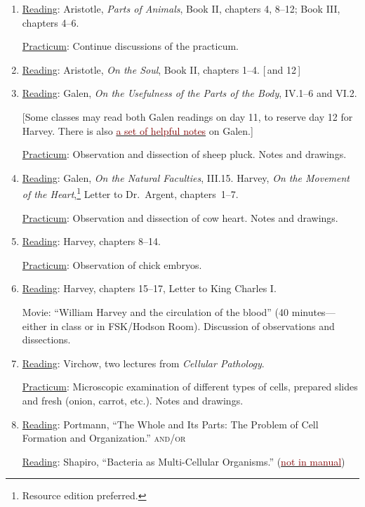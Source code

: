 \documentclass{article}
\newcommand{\rd}{\uline{Reading}}
\newcommand{\pc}{\uline{Practicum}}
\begin{document}
\begin{enumerate}
\item \rd: Aristotle, \emph{Parts of Animals}, Book II, chapters 4, 8--12; Book III, chapters 4--6.

\pc: Continue discussions of the practicum.

\item \rd:\label{soul} Aristotle, \emph{On the Soul}, Book II, chapters 1--4. [\,and 12\,]

\item \rd: Galen, \emph{On the Usefulness of the Parts of the Body}, IV.1--6 and VI.2.

 [Some classes may read
both Galen readings on day 11, to reserve day 12 for Harvey. There is also \href{https://sjca.sharepoint.com/:b:/r/sites/Departments/Faculty/Documents/Annapolis/Freshman\%20Lab/Schedule\%20and\%20files/Galen_notes.pdf?csf=1&web=1&e=CPEIlP}{\textcolor{Maroon}{a set of helpful notes}} on Galen.]

\pc: Observation and dissection of sheep pluck. Notes and drawings.

\item \rd: Galen, \emph{On the Natural Faculties}, III.15.
	Harvey, \emph{On the Movement of the Heart},\footnote{Resource edition preferred.} Letter to Dr.\
Argent, chapters\ 1--7.

\pc: Observation and dissection of cow heart. Notes and drawings.

\item \rd: Harvey, chapters 8--14.

	\pc: Observation of chick embryos.
\item \rd: Harvey, chapters 15--17, Letter to King Charles I.

	Movie: ``William Harvey and the circulation of the blood'' (40 minutes---either in class or in FSK/Hodson Room). Discussion of observations and dissections.

\item \rd: Virchow, two lectures from \emph{Cellular Pathology}.

	\pc: Microscopic examination of different types of cells, prepared slides and fresh (onion, carrot, etc.). Notes and drawings.
\item \rd: Portmann, ``The Whole and Its Parts: The Problem of Cell Formation and Organization.'' \textsc{and/or}

\rd: Shapiro, ``Bacteria as Multi-Cellular Organisms.'' (\href{https://sjca.sharepoint.com/:b:/r/sites/Departments/Faculty/Documents/Annapolis/Freshman\%20Lab/Schedule\%20and\%20files/Shapiro_1988_scientificamerican.pdf?csf=1&web=1&e=6tDLGk}{\textcolor{Maroon}{not in manual}})


\end{enumerate}
\end{document}
